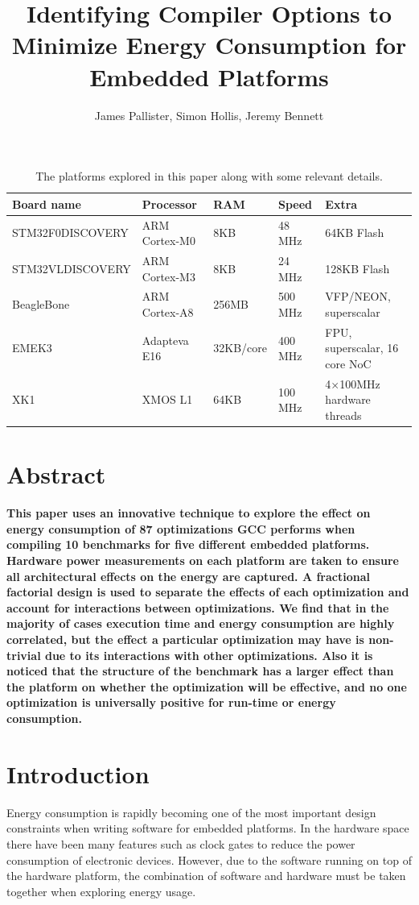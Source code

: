 \documentclass[twocolumn]{article}
\title{\bfseries\fontsize{22}{1}\selectfont Identifying Compiler Options to Minimize Energy Consumption for Embedded Platforms}
\author{James Pallister, Simon Hollis, Jeremy Bennett}
\newcommand{\nsection}[1]{\section{\bfseries #1}}
\let\oldcaption\caption
\renewcommand{\caption}[1]{\oldcaption{\textup{#1}}}
\begin{document}
\maketitle
\begin{table}[!hbt]
	\centering
	\begin{tabular}{l l l l l}
		\textbf{Board name} & \textbf{Processor} & \textbf{RAM} & \textbf{Speed} & \textbf{Extra} \\
		\hline
		STM32F0DISCOVERY	& ARM Cortex-M0 		& 8KB		& 48 MHz		  & 64KB Flash\\
		STM32VLDISCOVERY	& ARM Cortex-M3 		& 8KB		& 24 MHz		  & 128KB Flash\\
		BeagleBone			& ARM Cortex-A8 		& 256MB		& 500 MHz		  & VFP/NEON, superscalar\\
		EMEK3				& Adapteva E16 			& 32KB/core & 400 MHz		  & FPU, superscalar, 16 core NoC\\
		XK1					& XMOS L1 				& 64KB		& 100 MHz 		& 4$\times$100MHz hardware threads \\
	\end{tabular}
	\caption{The platforms explored in this paper along with some relevant details.}
	\label{Table:Platforms}
\end{table}

\nsection{Abstract}

{\bfseries
This paper uses an innovative technique to explore the effect on energy consumption of 87 optimizations GCC performs when compiling 10 benchmarks for five different embedded platforms. Hardware power measurements on each platform are taken to ensure all architectural effects on the energy are captured. A fractional factorial design is used to separate the effects of each optimization and account for interactions between optimizations. We find that in the majority of cases execution time and energy consumption are highly correlated, but the effect a particular optimization may have is non-trivial due to its interactions with other optimizations. Also it is noticed that the structure of the benchmark has a larger effect than the platform on whether the optimization will be effective, and no one optimization is universally positive for run-time or energy consumption.
}

\nsection{Introduction}


Energy consumption is rapidly becoming one of the most important design constraints when writing software for embedded platforms. In the hardware space there have been many features such as clock gates to reduce the power consumption of electronic devices. However, due to the software running on top of the hardware platform, the combination of software and hardware must be taken together when exploring energy usage.
\end{document}
